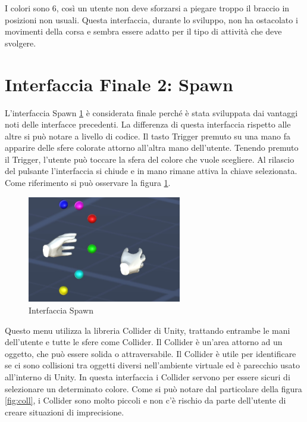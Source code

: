 \documentclass[target=bach,aauheader=]{thud}
\begin{document}
I colori sono 6, così un utente non deve sforzarsi a piegare troppo il braccio in posizioni non usuali.
Questa interfaccia, durante lo sviluppo, non ha ostacolato i movimenti della corsa e sembra essere adatto per il tipo di attività che deve svolgere. 

\section{Interfaccia Finale 2: Spawn} %
\label{int_spawn}
L'interfaccia Spawn \ref{fig:spawn} è considerata finale perché è stata sviluppata dai vantaggi noti delle interfacce precedenti.
La differenza di questa interfaccia rispetto alle altre si può notare a livello di codice.
Il tasto Trigger premuto su una mano fa apparire delle sfere colorate attorno all'altra mano dell'utente.
Tenendo premuto il Trigger, l'utente può toccare la sfera del colore che vuole scegliere.
Al rilascio del pulsante l'interfaccia si chiude e in mano rimane attiva la chiave selezionata. 
Come riferimento si può osservare la figura \ref{fig:spawn}. \\

\begin{figure}[h]
    \centering
    \includegraphics[width=0.60\textwidth]{spawn}
    \caption{Interfaccia Spawn}
    \label{fig:spawn}
\end{figure}

Questo menu utilizza la libreria Collider di Unity, trattando entrambe le mani dell'utente e tutte le sfere come Collider.
Il Collider è un'area attorno ad un oggetto, che può essere solida o attraversabile.
Il Collider è utile per identificare se ci sono collisioni tra oggetti diversi nell'ambiente virtuale ed è parecchio usato all'interno di Unity.
In questa interfaccia i Collider servono per essere sicuri di selezionare un determinato colore.
Come si può notare dal particolare della figura \ref{fig:coll}, i Collider sono molto piccoli e non c'è rischio da parte dell'utente di creare situazioni di imprecisione. \\
\end{document}
